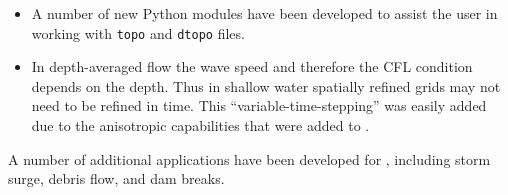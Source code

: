 \begin{itemize}
\item A number of new Python modules have been developed to assist the user
in working with {\tt topo} and {\tt dtopo} files.  

\item In depth-averaged flow the wave speed and therefore the CFL condition depends on the depth.  Thus in shallow water spatially refined grids may not need to be refined in time.  This ``variable-time-stepping'' was easily added due to the anisotropic capabilities that were added to \amrclaw.

\end{itemize} 

  A number of additional applications have been developed for
\geoclaw, including storm surge, debris flow, and dam breaks.